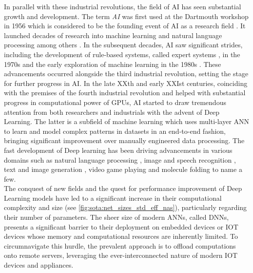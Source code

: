 In parallel with these industrial revolutions, the field of \ac{AI} has seen
substantial growth and development. The term \emph{\acl{AI}} was first used at
the Dartmouth workshop in 1956 which is considered to be the founding event of
\ac{AI} as a research field \cite{dartmouth1956}. It launched decades of
research into machine learning and natural language processing among others
\cite{nilsson1998artificial}. In the subsequent decades, \ac{AI} saw significant
strides, including the development of rule-based systems, called expert systems
\cite{giarratano1994expert}, in the 1970s and the early exploration of machine
learning in the 1980s \cite{rumelhart1986learning}. These advancements occurred
alongside the third industrial revolution, setting the stage for further
progress in \ac{AI}. In the late XXth and early XXIst centuries, coinciding with
the premises of the fourth industrial revolution and helped with substantial
progress in computational power of \acp{GPU}, \ac{AI} started to draw tremendous
attention from both researchers and industrials with the advent of Deep
Learning. The latter is a subfield of machine learning which uses multi-layer
\ac{ANN} to learn and model complex patterns in datasets in an end-to-end
fashion, bringing significant improvement over manually engineered data
processing. The fast development of Deep learning has been driving advancements
in various domains such as natural language processing
\cite{DBLP:conf/emnlp/BudzianowskiV19,DBLP:conf/naacl/DevlinCLT19,DBLP:conf/nips/VaswaniSPUJGKP17},
image and speech recognition
\cite{DBLP:conf/nips/KrizhevskySH12,DBLP:journals/corr/SimonyanZ14a,DBLP:conf/cvpr/HeZRS16,DBLP:journals/corr/HannunCCCDEPSSCN14,DBLP:conf/icassp/ChanJLV16,DBLP:conf/icml/AmodeiABCCCCCCD16},
text and image generation
\cite{goodfellow2020generative,karras2019style,DBLP:conf/emnlp/BudzianowskiV19},
video game playing \cite{silver2016mastering,silver2018general} and molecule
folding \cite{jumper2021highly} to name a few.\\


The conquest of new fields and the quest for performance improvement of Deep
Learning models have led to a significant increase in their computational
complexity and size (see \cref{fig:sota:net_sizes_std_eff_nas}), particularly
regarding their number of parameters. The sheer size of modern \acp{ANN}, called
\acp{DNN}, presents a significant barrier to their deployment on embedded
devices or \ac{IOT} devices whose memory and computational resources are
inherently limited. To circumnavigate this hurdle, the prevalent approach is to
offload computations onto remote servers, leveraging the ever-interconnected
nature of modern \ac{IOT} devices and appliances.\\

